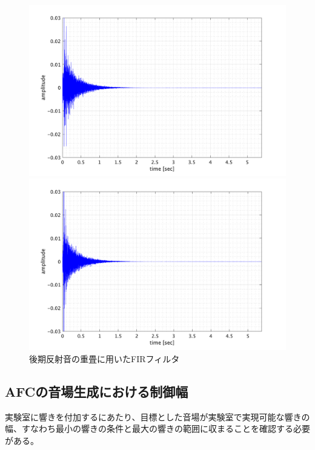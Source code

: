 \documentclass[11pt,a4j]{jreport}
\begin{document}
\begin{figure}[H]
  \begin{minipage}[b]{.5\linewidth}
    \centering
    \includegraphics[width=.8\linewidth]{images/convolutedIr/REV3.png}
  \end{minipage}%
  \begin{minipage}[b]{.5\linewidth}
    \centering
    \includegraphics[width=.8\linewidth]{images/convolutedIr/REV4.png}
  \end{minipage}

  \centering
  \caption{後期反射音の重畳に用いたFIRフィルタ}
  \label{fig:後期反射音の重畳に用いたフィルタ}
\end{figure}

\newpage
\subsection{AFCの音場生成における制御幅}
実験室に響きを付加するにあたり、目標とした音場が実験室で実現可能な響きの幅、すなわち最小の響きの条件と最大の響きの範囲に収まることを確認する必要がある。
\end{document}

